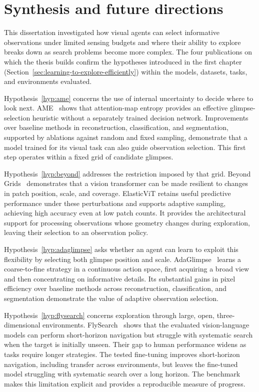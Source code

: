 \chapter{Synthesis and future directions}
\label{chap:conclusion}

This dissertation investigated how visual agents can select informative observations under limited sensing budgets and where their ability to explore breaks down as search problems become more complex. The four publications on which the thesis builds confirm the hypotheses introduced in the first chapter (Section~\ref{sec:learning-to-explore-efficiently}) within the models, datasets, tasks, and environments evaluated.

Hypothesis~\ref{hyp:ame} concerns the use of internal uncertainty to decide where to look next. AME~ shows that attention-map entropy provides an effective glimpse-selection heuristic without a separately trained decision network. Improvements over baseline methods in reconstruction, classification, and segmentation, supported by ablations against random and fixed sampling, demonstrate that a model trained for its visual task can also guide observation selection. This first step operates within a fixed grid of candidate glimpses.

Hypothesis~\ref{hyp:beyond} addresses the restriction imposed by that grid. Beyond Grids~ demonstrates that a vision transformer can be made resilient to changes in patch position, scale, and coverage. ElasticViT retains useful predictive performance under these perturbations and supports adaptive sampling, achieving high accuracy even at low patch counts. It provides the architectural support for processing observations whose geometry changes during exploration, leaving their selection to an observation policy.

Hypothesis~\ref{hyp:adaglimpse} asks whether an agent can learn to exploit this flexibility by selecting both glimpse position and scale. AdaGlimpse~ learns a coarse-to-fine strategy in a continuous action space, first acquiring a broad view and then concentrating on informative details. Its substantial gains in pixel efficiency over baseline methods across reconstruction, classification, and segmentation demonstrate the value of adaptive observation selection.

Hypothesis~\ref{hyp:flysearch} concerns exploration through large, open, three-dimensional environments. FlySearch~ shows that the evaluated vision-language models can perform short-horizon navigation but struggle with systematic search when the target is initially unseen. Their gap to human performance widens as tasks require longer strategies. The tested fine-tuning improves short-horizon navigation, including transfer across environments, but leaves the fine-tuned model struggling with systematic search over a long horizon. The benchmark makes this limitation explicit and provides a reproducible measure of progress.

